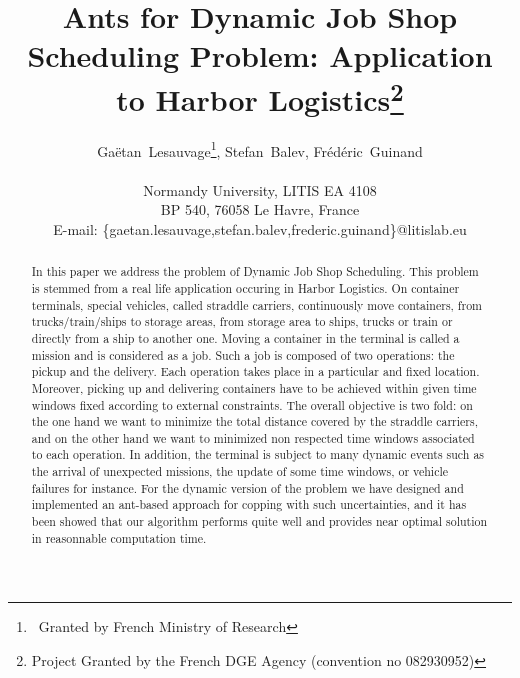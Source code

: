\documentclass[a4paper,10pt]{article}
\title{Ants for Dynamic Job Shop Scheduling Problem: Application to Harbor Logistics\thanks{Project Granted by the French DGE Agency (convention no 082930952)}
}
\author{Ga\"{e}tan~Lesauvage\thanks{~Granted by French Ministry of Research}, Stefan~Balev, Fr\'{e}d\'{e}ric~Guinand\\\\
\medskip
Normandy University, LITIS EA 4108\\
BP 540, 76058 Le Havre, France\\
\medskip
E-mail: \{gaetan.lesauvage,stefan.balev,frederic.guinand\}@litislab.eu\\
}
\begin{document}
\maketitle

\newpage 

\begin{abstract}

In this paper we address the problem of Dynamic Job Shop Scheduling. This problem is stemmed from a real life application occuring in Harbor Logistics. On container terminals, special vehicles, called straddle carriers, continuously move containers, from trucks/train/ships to storage areas, from storage area to ships, trucks or train or directly from a ship to another one. Moving a container in the terminal is called a mission and is considered as a job. Such a job is composed of two operations: the pickup and the delivery. Each operation takes place in a particular and fixed location. Moreover, picking up and delivering containers have to be achieved within given time windows fixed according to external constraints. The overall objective is two fold: on the one hand we want to minimize the total distance covered by the straddle carriers, and on the other hand we want to minimized non respected time windows associated to each operation. 
% 
In addition, the terminal is subject to many dynamic events such as the arrival of unexpected missions, the update of some time windows, or vehicle failures for instance. For the dynamic version of the problem we have designed and implemented an ant-based approach for copping with such uncertainties, and it has been showed that our algorithm performs quite well and provides near optimal solution in reasonnable computation time.
\end{abstract}
\end{document}
